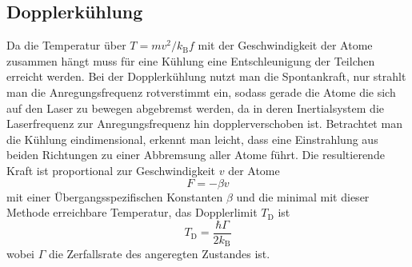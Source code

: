 \documentclass[twoside,colorback,accentcolor=tud4c,11pt]{tudreport}
\begin{document}
\subsection{Dopplerkühlung}
Da die Temperatur über $ T=mv^2/k_\text{B}f $ mit der Geschwindigkeit der Atome zusammen hängt muss für eine Kühlung eine Entschleunigung der Teilchen erreicht werden. Bei der Dopplerkühlung nutzt man die Spontankraft, nur strahlt man die Anregungsfrequenz rotverstimmt ein, sodass gerade die Atome die sich auf den Laser zu bewegen abgebremst werden, da in deren Inertialsystem die Laserfrequenz zur Anregungsfrequenz hin dopplerverschoben ist. Betrachtet man die Kühlung eindimensional, erkennt man leicht, dass eine Einstrahlung aus beiden Richtungen zu einer Abbremsung aller Atome führt. Die resultierende Kraft ist proportional zur Geschwindigkeit $ v $ der Atome
\begin{equation}
F= -\beta v
\end{equation}
mit einer Übergangsspezifischen Konstanten $ \beta $ \cite{anl} und die minimal mit dieser Methode erreichbare Temperatur, das Dopplerlimit $ T_\text{D} $ ist
\begin{equation}
T_\text{D}=\frac{\hbar\Gamma}{2k_\text{B}}
\end{equation}
wobei $ \Gamma $ die Zerfallsrate des angeregten Zustandes ist.
\end{document}
